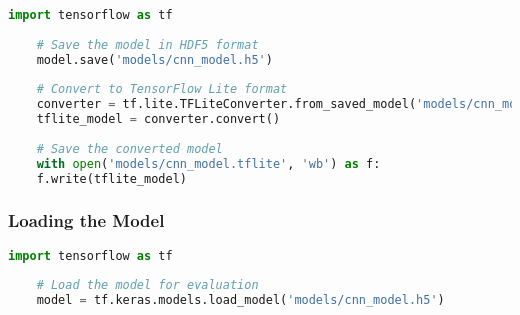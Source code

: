\begin{lstlisting}[language=Python, caption={Saving and Converting a Model to TensorFlow Lite}, label={code:tf-lite-conversion}, style=pythonstyle]
	import tensorflow as tf
	
	# Save the model in HDF5 format
	model.save('models/cnn_model.h5')
	
	# Convert to TensorFlow Lite format
	converter = tf.lite.TFLiteConverter.from_saved_model('models/cnn_model.h5')
	tflite_model = converter.convert()
	
	# Save the converted model
	with open('models/cnn_model.tflite', 'wb') as f:
	f.write(tflite_model)
\end{lstlisting}


\subsubsection{Loading the Model}
\begin{lstlisting}[language=Python, caption={Loading a Saved Model for Evaluation}, label={code:tf-load-model}, style=pythonstyle]
	import tensorflow as tf
	
	# Load the model for evaluation
	model = tf.keras.models.load_model('models/cnn_model.h5')
\end{lstlisting}


